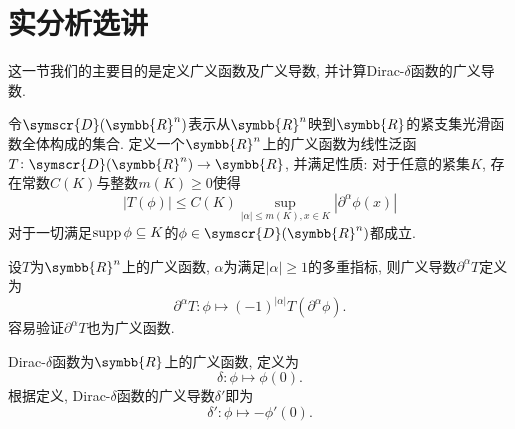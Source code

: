 \section{实分析选讲}

这一节我们的主要目的是定义广义函数及广义导数, 并计算Dirac-$\delta$函数的广义导数.

令$\symscr{D}(\symbb{R}^n)$表示从$\symbb{R}^n$映到$\symbb{R}$的紧支集光滑函数全体构成的集合. 定义一个$\symbb{R}^n$上的广义函数为线性泛函$T\colon \symscr{D}(\symbb{R}^n)\to \symbb{R}$, 并满足性质: 对于任意的紧集$K$, 存在常数$C(K)$与整数$m(K)\geq 0$使得
\begin{equation}
    |T(\phi)|\leq C(K)\sup_{|\alpha|\leq m(K), x\in K}|\partial^\alpha\phi(x)|
\end{equation}
对于一切满足$\operatorname{supp}\phi\subseteq K$的$\phi\in\symscr{D}(\symbb{R}^n)$都成立\cite[Sect. 6.3, 第316页]{ciarlet2013linear}.

设$T$为$\symbb{R}^n$上的广义函数, $\alpha$为满足$|\alpha|\geq 1$的多重指标, 则广义导数$\partial^\alpha T$定义为
\begin{equation}
    \partial^\alpha T\colon \phi\mapsto (-1)^{|\alpha|}T(\partial^\alpha\phi).
\end{equation}
容易验证$\partial^\alpha T$也为广义函数\cite[Sect. 6.3, 第318页]{ciarlet2013linear}.

Dirac-$\delta$函数为$\symbb{R}$上的广义函数, 定义为
\begin{equation}
    \delta\colon \phi\mapsto \phi(0).
\end{equation}
根据定义, Dirac-$\delta$函数的广义导数$\delta'$即为
\begin{equation}
    \delta'\colon \phi\mapsto -\phi'(0).
\end{equation}

